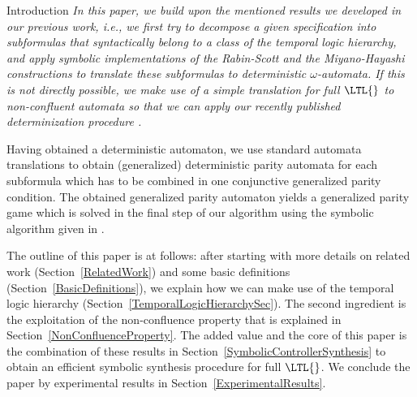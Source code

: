 \documentclass[copyright,creativecommons]{eptcs}
\begin{document}
\begin{section}{Introduction}
{\em In this paper, we build upon the mentioned results we developed in our previous work, i.e., we first try to  decompose a given specification into subformulas that syntactically belong to a class of the temporal logic hierarchy, and apply symbolic implementations of the Rabin-Scott and the Miyano-Hayashi constructions to translate these subformulas to deterministic $\omega$-automata. If this is not directly possible, we make use of a simple translation for full $\LTL{}$ to non-confluent automata so that we can apply our recently published determinization procedure \cite{MoSc08}.}

Having obtained a deterministic automaton, we use standard automata translations to obtain (generalized) deterministic parity automata for each subformula which has to be combined in one conjunctive generalized parity condition. The obtained generalized parity automaton yields a generalized parity game which is solved in the final step of our algorithm using the symbolic algorithm given in \cite{ChHP07}.

The outline of this paper is at follows: after starting with more details on related work (Section~\ref{RelatedWork}) and some basic definitions (Section~\ref{BasicDefinitions}), we explain how we can make use of the temporal logic hierarchy (Section~\ref{TemporalLogicHierarchySec}). The second ingredient is the exploitation of the non-confluence property that is explained in Section~\ref{NonConfluenceProperty}. The added value and the core of this paper is the combination of these results in Section~\ref{SymbolicControllerSynthesis} to obtain an efficient symbolic synthesis procedure for full $\LTL{}$. We conclude the paper by experimental results in Section~\ref{ExperimentalResults}.
\end{section}
\end{document}
